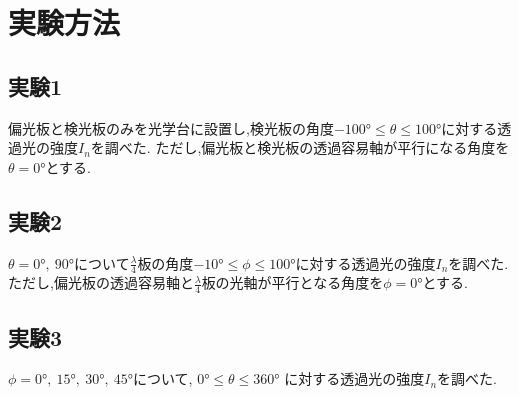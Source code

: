 \section{実験方法}
\subsection{実験1}
偏光板と検光板のみを光学台に設置し,検光板の角度$-100\si{\degree}\leq\theta\leq100\si{\degree}$に対する透過光の強度$I_n$を調べた.
ただし,偏光板と検光板の透過容易軸が平行になる角度を$\theta=0\si{\degree}$とする.
\subsection{実験2}
$\theta=0\si{\degree},\ 90\si{\degree}$について$\frac{\lambda}{4}$板の角度$-10\si{\degree}\leq\phi\leq100\si{\degree}$に対する透過光の強度$I_n$を調べた.
ただし,偏光板の透過容易軸と$\frac{\lambda}{4}$板の光軸が平行となる角度を$\phi=0\si{\degree}$とする.
\subsection{実験3}
$\phi=0\si{\degree},\ 15\si{\degree},\ 30\si{\degree},\ 45\si{\degree}$について, $0\si{\degree}\leq\theta\leq360\si{\degree}$
に対する透過光の強度$I_n$を調べた.